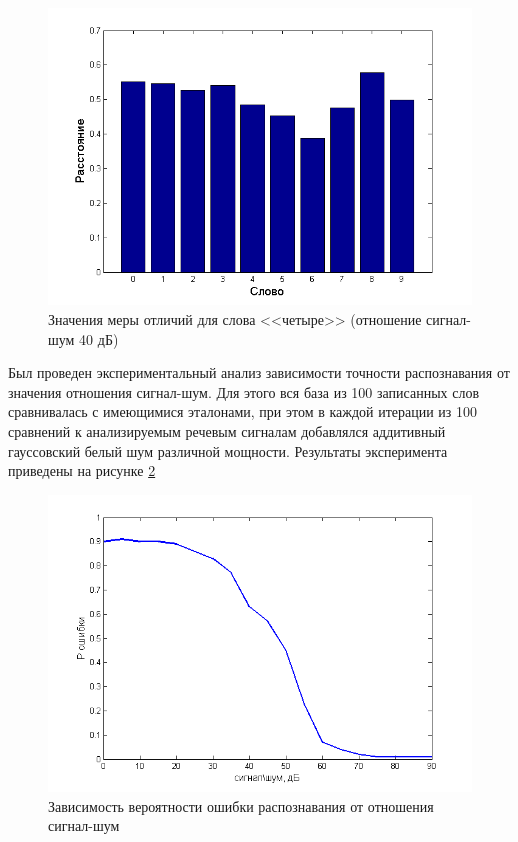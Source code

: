 \documentclass[a4paper,14pt,russian,utf8,nocolumnsxix,nocolumnxxxi,nocolumnxxxii]{eskdtext}
\begin{document}
\begin{figure}[H]	
	\centering
	\includegraphics[width=120mm]{40db_4.png}			
	\caption{Значения меры отличий для слова <<четыре>> (отношение сигнал-шум 40 дБ)}
	\label{40db_4}
\end{figure}


Был проведен экспериментальный анализ зависимости точности распознавания от значения отношения сигнал-шум. Для этого вся база из 100 записанных слов сравнивалась с имеющимися эталонами, при этом в каждой итерации из 100 сравнений к анализируемым речевым сигналам добавлялся аддитивный гауссовский белый шум различной мощности. Результаты эксперимента приведены на рисунке \ref{snr-err}

\begin{figure}[H]	
	\centering
	\includegraphics[width=120mm]{snr-err.png}			
	\caption{Зависимость вероятности ошибки распознавания от отношения сигнал-шум}
	\label{snr-err}
\end{figure}
\end{document}
